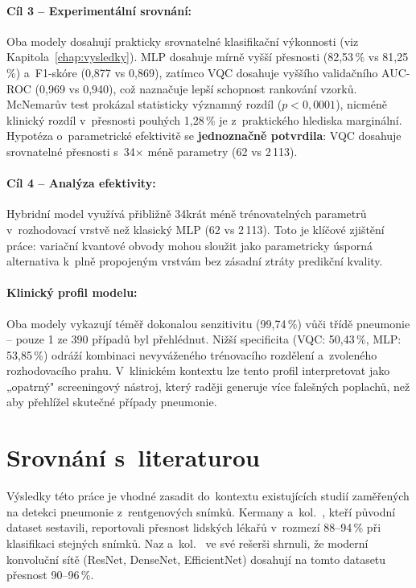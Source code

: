 \documentclass[12pt, a4paper]{report}
\begin{document}
\paragraph{Cíl 3 -- Experimentální srovnání:} Oba modely dosahují prakticky srovnatelné klasifikační výkonnosti (viz Kapitola~\ref{chap:vysledky}). MLP dosahuje mírně vyšší přesnosti (82{,}53\,\% vs 81{,}25\,\%) a~F1-skóre (0{,}877 vs 0{,}869), zatímco VQC dosahuje vyššího validačního AUC-ROC (0{,}969 vs 0{,}940), což naznačuje lepší schopnost rankování vzorků. McNemarův test prokázal statisticky významný rozdíl ($p < 0{,}0001$), nicméně klinický rozdíl v~přesnosti pouhých 1{,}28\,\% je z~praktického hlediska marginální. Hypotéza o~parametrické efektivitě se \textbf{jednoznačně potvrdila}: VQC dosahuje srovnatelné přesnosti s~34× méně parametry (62 vs 2\,113).

\paragraph{Cíl 4 -- Analýza efektivity:} Hybridní model využívá přibližně 34krát méně trénovatelných parametrů v~rozhodovací vrstvě než klasický MLP (62 vs 2\,113). Toto je klíčové zjištění práce: variační kvantové obvody mohou sloužit jako parametricky úsporná alternativa k~plně propojeným vrstvám bez zásadní ztráty predikční kvality.

\paragraph{Klinický profil modelu:} Oba modely vykazují téměř dokonalou senzitivitu (99{,}74\,\%) vůči třídě pneumonie -- pouze 1 ze 390 případů byl přehlédnut. Nižší specificita (VQC: 50{,}43\,\%, MLP: 53{,}85\,\%) odráží kombinaci nevyváženého trénovacího rozdělení a~zvoleného rozhodovacího prahu. V~klinickém kontextu lze tento profil interpretovat jako „opatrný" screeningový nástroj, který raději generuje více falešných poplachů, než aby přehlížel skutečné případy pneumonie.

\section{Srovnání s~literaturou}

Výsledky této práce je vhodné zasadit do~kontextu existujících studií zaměřených na detekci pneumonie z~rentgenových snímků. Kermany a~kol.~\cite{chest_xray_kaggle}, kteří původní dataset sestavili, reportovali přesnost lidských lékařů v~rozmezí 88--94\,\% při klasifikaci stejných snímků. Naz a~kol.~\cite{pneumonia_deep_learning_review} ve své rešerši shrnuli, že moderní konvoluční sítě (ResNet, DenseNet, EfficientNet) dosahují na tomto datasetu přesnost 90--96\,\%.
\end{document}
